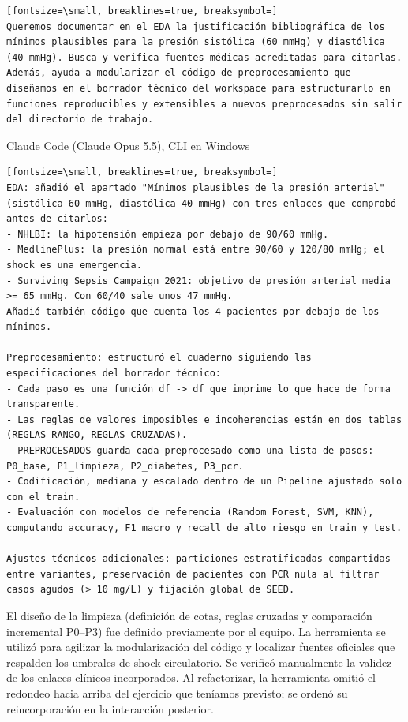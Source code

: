 \documentclass[12pt,a4paper,oneside]{book}
\begin{document}
\begin{iaprompt}
\begin{Verbatim}[fontsize=\small, breaklines=true, breaksymbol=]
Queremos documentar en el EDA la justificación bibliográfica de los mínimos plausibles para la presión sistólica (60 mmHg) y diastólica (40 mmHg). Busca y verifica fuentes médicas acreditadas para citarlas. Además, ayuda a modularizar el código de preprocesamiento que diseñamos en el borrador técnico del workspace para estructurarlo en funciones reproducibles y extensibles a nuevos preprocesados sin salir del directorio de trabajo.
\end{Verbatim}
\end{iaprompt}
\begin{iaresp}{Claude Code (Claude Opus 5.5), CLI en Windows}
\begin{Verbatim}[fontsize=\small, breaklines=true, breaksymbol=]
EDA: añadió el apartado "Mínimos plausibles de la presión arterial" (sistólica 60 mmHg, diastólica 40 mmHg) con tres enlaces que comprobó antes de citarlos:
- NHLBI: la hipotensión empieza por debajo de 90/60 mmHg.
- MedlinePlus: la presión normal está entre 90/60 y 120/80 mmHg; el shock es una emergencia.
- Surviving Sepsis Campaign 2021: objetivo de presión arterial media >= 65 mmHg. Con 60/40 sale unos 47 mmHg.
Añadió también código que cuenta los 4 pacientes por debajo de los mínimos.

Preprocesamiento: estructuró el cuaderno siguiendo las especificaciones del borrador técnico:
- Cada paso es una función df -> df que imprime lo que hace de forma transparente.
- Las reglas de valores imposibles e incoherencias están en dos tablas (REGLAS_RANGO, REGLAS_CRUZADAS).
- PREPROCESADOS guarda cada preprocesado como una lista de pasos: P0_base, P1_limpieza, P2_diabetes, P3_pcr.
- Codificación, mediana y escalado dentro de un Pipeline ajustado solo con el train.
- Evaluación con modelos de referencia (Random Forest, SVM, KNN), computando accuracy, F1 macro y recall de alto riesgo en train y test.

Ajustes técnicos adicionales: particiones estratificadas compartidas entre variantes, preservación de pacientes con PCR nula al filtrar casos agudos (> 10 mg/L) y fijación global de SEED.
\end{Verbatim}
\end{iaresp}
\begin{iaanalisis}
El diseño de la limpieza (definición de cotas, reglas cruzadas y comparación incremental P0--P3) fue definido previamente por el equipo. La herramienta se utilizó para agilizar la modularización del código y localizar fuentes oficiales que respalden los umbrales de shock circulatorio. Se verificó manualmente la validez de los enlaces clínicos incorporados. Al refactorizar, la herramienta omitió el redondeo hacia arriba del ejercicio que teníamos previsto; se ordenó su reincorporación en la interacción posterior.
\end{iaanalisis}
\end{document}
